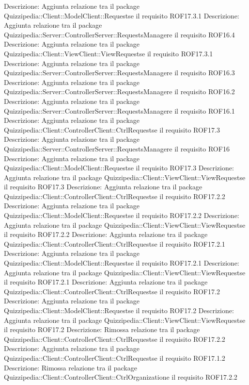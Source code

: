 Descrizione: Aggiunta relazione tra il package Quizzipedia::Client::ModelClient::Requestse il requisito ROF17.3.1 
Descrizione: Aggiunta relazione tra il package Quizzipedia::Server::ControllerServer::RequestsManagere il requisito ROF16.4 
Descrizione: Aggiunta relazione tra il package Quizzipedia::Client::ViewClient::ViewRequestse il requisito ROF17.3.1 
Descrizione: Aggiunta relazione tra il package Quizzipedia::Server::ControllerServer::RequestsManagere il requisito ROF16.3 
Descrizione: Aggiunta relazione tra il package Quizzipedia::Server::ControllerServer::RequestsManagere il requisito ROF16.2 
Descrizione: Aggiunta relazione tra il package Quizzipedia::Server::ControllerServer::RequestsManagere il requisito ROF16.1 
Descrizione: Aggiunta relazione tra il package Quizzipedia::Client::ControllerClient::CtrlRequestse il requisito ROF17.3 
Descrizione: Aggiunta relazione tra il package Quizzipedia::Server::ControllerServer::RequestsManagere il requisito ROF16 
Descrizione: Aggiunta relazione tra il package Quizzipedia::Client::ModelClient::Requestse il requisito ROF17.3 
Descrizione: Aggiunta relazione tra il package Quizzipedia::Client::ViewClient::ViewRequestse il requisito ROF17.3 
Descrizione: Aggiunta relazione tra il package Quizzipedia::Client::ControllerClient::CtrlRequestse il requisito ROF17.2.2 
Descrizione: Aggiunta relazione tra il package Quizzipedia::Client::ModelClient::Requestse il requisito ROF17.2.2 
Descrizione: Aggiunta relazione tra il package Quizzipedia::Client::ViewClient::ViewRequestse il requisito ROF17.2.2 
Descrizione: Aggiunta relazione tra il package Quizzipedia::Client::ControllerClient::CtrlRequestse il requisito ROF17.2.1 
Descrizione: Aggiunta relazione tra il package Quizzipedia::Client::ModelClient::Requestse il requisito ROF17.2.1 
Descrizione: Aggiunta relazione tra il package Quizzipedia::Client::ViewClient::ViewRequestse il requisito ROF17.2.1 
Descrizione: Aggiunta relazione tra il package Quizzipedia::Client::ControllerClient::CtrlRequestse il requisito ROF17.2 
Descrizione: Aggiunta relazione tra il package Quizzipedia::Client::ModelClient::Requestse il requisito ROF17.2 
Descrizione: Aggiunta relazione tra il package Quizzipedia::Client::ViewClient::ViewRequestse il requisito ROF17.2 
Descrizione: Rimossa relazione tra il package Quizzipedia::Client::ControllerClient::CtrlRequestse il requisito ROF17.2.2 
Descrizione: Aggiunta relazione tra il package Quizzipedia::Client::ControllerClient::CtrlRequestse il requisito ROF17.1.2 
Descrizione: Rimossa relazione tra il package Quizzipedia::Client::ControllerClient::CtrlOrganizatione il requisito ROF17.2.2 

